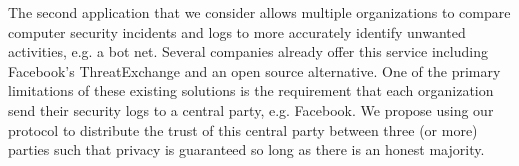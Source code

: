 The second application that we consider allows multiple organizations to compare computer security incidents and logs to more accurately identify unwanted activities, e.g. a bot net. Several companies already offer this service including Facebook's ThreatExchange\cite{threat} and an open source alternative\cite{alt_threat}. One of the primary limitations of these existing solutions is the requirement that each organization send their security logs to a central party, e.g. Facebook. We propose using our protocol to distribute the trust of this central party between three (or more) parties such that privacy is guaranteed so long as there is an honest majority.



